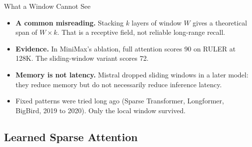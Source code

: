 \begin{frame}{What a Window Cannot See}
    \begin{itemize}\itemsep0.55em
        \item \textbf{A common misreading.} Stacking $k$ layers of window $W$ gives a theoretical span of $W\times k$. That is a receptive field, not reliable long-range recall.
        \item \textbf{Evidence.} In MiniMax's ablation, full attention scores 90 on RULER at 128K. The sliding-window variant scores 72.
        \item \textbf{Memory is not latency.} Mistral dropped sliding windows in a later model: they reduce memory but do not necessarily reduce inference latency.
        \item Fixed patterns were tried long ago (Sparse Transformer, Longformer, BigBird, 2019 to 2020). Only the local window survived.
    \end{itemize}
    \vspace{0.3em}
\end{frame}

\subsection{Learned Sparse Attention}

